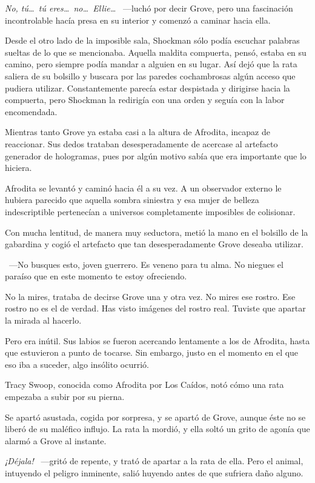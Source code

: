 \emph{No, tú\dots\ tú eres\dots\ no\dots\ Ellie\dots} ~---luchó por decir Grove, pero una fascinación incontrolable hacía presa en su interior y comenzó a caminar hacia ella.

Desde el otro lado de la imposible sala, Shockman sólo podía escuchar palabras sueltas de lo que se mencionaba. Aquella maldita compuerta, pensó, estaba en su camino, pero siempre podía mandar a alguien en su lugar. Así dejó que la rata saliera de su bolsillo y buscara por las paredes cochambrosas algún acceso que pudiera utilizar. Constantemente parecía estar despistada y dirigirse hacia la compuerta, pero Shockman la redirigía con una orden y seguía con la labor encomendada.

Mientras tanto Grove ya estaba casi a la altura de Afrodita, incapaz de reaccionar. Sus dedos trataban desesperadamente de acercase al artefacto generador de hologramas, pues por algún motivo sabía que era importante que lo hiciera.

Afrodita se levantó y caminó hacia él a su vez. A un observador externo le hubiera parecido que aquella sombra siniestra y esa mujer de belleza indescriptible pertenecían a universos completamente imposibles de colisionar.

Con mucha lentitud, de manera muy seductora, metió la mano en el bolsillo de la gabardina y cogió el artefacto que tan desesperadamente Grove deseaba utilizar.

~---No busques esto, joven guerrero. Es veneno para tu alma. No niegues el paraíso que en este momento te estoy ofreciendo.

No la mires, trataba de decirse Grove una y otra vez. No mires ese rostro. Ese rostro no es el de verdad. Has visto imágenes del rostro real. Tuviste que apartar la mirada al hacerlo.

Pero era inútil. Sus labios se fueron acercando lentamente a los de Afrodita, hasta que estuvieron a punto de tocarse. Sin embargo, justo en el momento en el que eso iba a suceder, algo insólito ocurrió.

Tracy Swoop, conocida como Afrodita por Los Caídos, notó cómo una rata empezaba a subir por su pierna.

Se apartó asustada, cogida por sorpresa, y se apartó de Grove, aunque éste no se liberó de su maléfico influjo. La rata la mordió, y ella soltó un grito de agonía que alarmó a Grove al instante.

\emph{¡Déjala!} ~---gritó de repente, y trató de apartar a la rata de ella. Pero el animal, intuyendo el peligro inminente, salió huyendo antes de que sufriera daño alguno.

